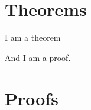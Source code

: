 \documentclass{article}
\begin{document}
\section{Theorems}

\begin{thmE}
  I am a theorem
\end{thmE}
\begin{proofE}
  And I am a proof.
\end{proofE}

\section{Proofs}
\printProofs
\end{document}
